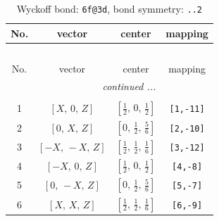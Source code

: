 \documentclass[fleqn,8pt]{jsarticle}
\begin{document}
\begin{longtable}{cccc}
\caption{Wyckoff bond: {\tt 6f@3d}, bond symmetry: {\tt ..2}}
 \\
 \hline \hline
No. & vector & center & mapping \\ \hline \endfirsthead

\multicolumn{3}{l}{\tablename\ \thetable{}} \\
 \hline \hline
No. & vector & center & mapping \\ \hline \endhead

 \hline \hline
\multicolumn{3}{r}{\footnotesize\it continued ...} \\ \endfoot

 \hline \hline
\multicolumn{3}{r}{} \\ \endlastfoot

1 & $\left[ X,\, 0,\, Z \right]$ & $\left[ \frac{1}{2},\, 0,\, \frac{1}{2} \right]$ & {\tt [1,-11]} \\ \hline
2 & $\left[ 0,\, X,\, Z \right]$ & $\left[ 0,\, \frac{1}{2},\, \frac{5}{6} \right]$ & {\tt [2,-10]} \\ \hline
3 & $\left[ - X,\, - X,\, Z \right]$ & $\left[ \frac{1}{2},\, \frac{1}{2},\, \frac{1}{6} \right]$ & {\tt [3,-12]} \\ \hline
4 & $\left[ - X,\, 0,\, Z \right]$ & $\left[ \frac{1}{2},\, 0,\, \frac{1}{2} \right]$ & {\tt [4,-8]} \\ \hline
5 & $\left[ 0,\, - X,\, Z \right]$ & $\left[ 0,\, \frac{1}{2},\, \frac{5}{6} \right]$ & {\tt [5,-7]} \\ \hline
6 & $\left[ X,\, X,\, Z \right]$ & $\left[ \frac{1}{2},\, \frac{1}{2},\, \frac{1}{6} \right]$ & {\tt [6,-9]} \\
\end{longtable}
\renewcommand{\arraystretch}{1.2}
\end{document}
